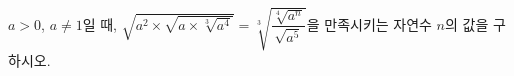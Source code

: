 $a>0$, $a\ne 1$일 때, $\sqrt{a^2\times\sqrt{a\times\sqrt[3]{a^4}}}=\sqrt[3]{\dfrac{\sqrt[4]{a^n}}{\sqrt{a^5}}}$을 만족시키는 자연수 $n$의 값을 구하시오.
